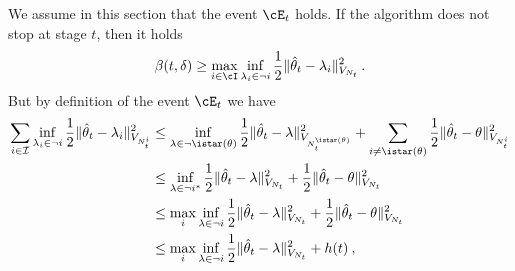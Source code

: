 We assume in this section that the event $\cE_t$ holds. If the algorithm does not stop at stage $t$, then it holds
\begin{align*}
\beta(t,\delta)
\ge\max_{i\in\cI} \inf_{\lambda_i \in \neg i}\frac{1}{2} \Vert \hat{\theta}_t - \lambda_i \Vert_{V_{N_t}}^2
\,.
\end{align*}
But by definition of the event $\cE_t$ we have
\begin{align*}
\sum_{i\in \mathcal I} \inf_{\lambda_i\in \neg i} \frac{1}{2}\Vert \hat{\theta}_t - \lambda_i \Vert^2_{V_{N_t^i}}
&\leq\inf_{\lambda\in \neg \istar(\theta)} \frac{1}{2}\Vert \hat{\theta}_t - \lambda \Vert^2_{V_{N_t^{\istar(\theta)}}}
	 + \sum_{i\neq \istar(\theta)} \frac{1}{2}\Vert \hat{\theta}_t - \theta \Vert^2_{V_{N_t^i}}
\\
&\leq\inf_{\lambda\in \neg i^*} \frac{1}{2}\Vert \hat{\theta}_t - \lambda \Vert^2_{V_{N_t}}
	 + \frac{1}{2}\Vert \hat{\theta}_t - \theta \Vert^2_{V_{N_t}}
\\
&\leq\max_i \inf_{\lambda\in \neg i} \frac{1}{2}\Vert \hat{\theta}_t - \lambda \Vert^2_{V_{N_t}}
	 + \frac{1}{2}\Vert \hat{\theta}_t - \theta \Vert^2_{V_{N_t}}
\\
&\leq\max_i \inf_{\lambda\in \neg i} \frac{1}{2}\Vert \hat{\theta}_t - \lambda \Vert^2_{V_{N_t}}
	 + h(t)
\:,
\end{align*}
